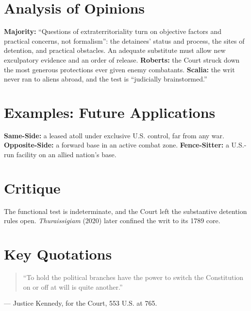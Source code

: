\documentclass[12pt]{article}
\begin{document}
\section{Analysis of Opinions}
\textbf{Majority:} ``Questions of extraterritoriality turn on objective factors and practical concerns, not formalism'': the detainees' status and process, the sites of detention, and practical obstacles. An adequate substitute must allow new exculpatory evidence and an order of release. \textbf{Roberts:} the Court struck down the most generous protections ever given enemy combatants. \textbf{Scalia:} the writ never ran to aliens abroad, and the test is ``judicially brainstormed.''

\section{Examples: Future Applications}
\textbf{Same-Side:} a leased atoll under exclusive U.S. control, far from any war. \textbf{Opposite-Side:} a forward base in an active combat zone. \textbf{Fence-Sitter:} a U.S.-run facility on an allied nation's base.

\section{Critique}
The functional test is indeterminate, and the Court left the substantive detention rules open. \textit{Thuraissigiam} (2020) later confined the writ to its 1789 core.

\section{Key Quotations}
\begin{quote}
``To hold the political branches have the power to switch the Constitution on or off at will is quite another.''
\end{quote}
\noindent --- Justice Kennedy, for the Court, 553 U.S. at 765.
\end{document}
